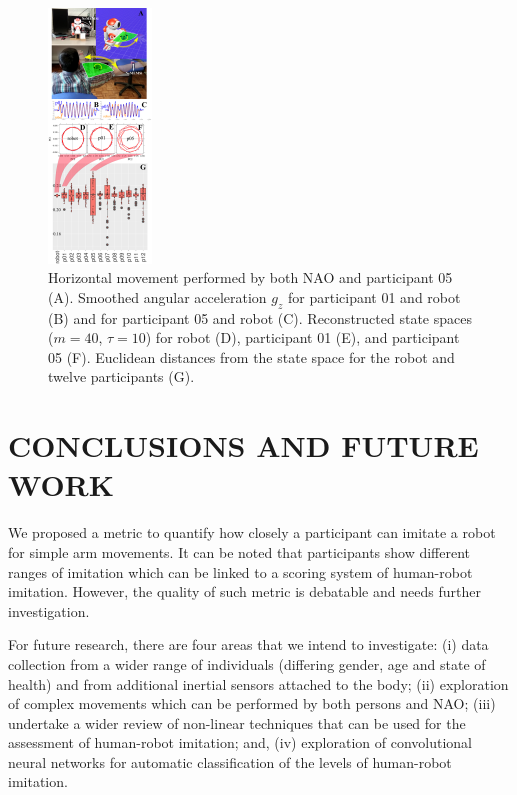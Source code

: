 \documentclass{sig-alternate-05-2015}
\begin{document}
\begin{figure}[ht]
\centering
\includegraphics[width=0.245\textwidth]{fig06}
\caption{
Horizontal movement performed by both NAO and participant 05 (A). 
Smoothed angular acceleration $g_z$ for participant 01  and robot (B)
and for participant 05 and robot (C).
Reconstructed state spaces  ($m=40$, $\tau=10$) for robot (D), participant 01 (E), and participant 05 (F).
Euclidean distances from the state space for the robot and twelve participants (G).
}
\label{fig:main}
\end{figure}



\section{CONCLUSIONS AND FUTURE WORK}
We proposed a metric to quantify how closely a participant can imitate a robot for simple arm
movements.
It can be noted
that participants show different ranges 
of imitation which can be linked to a scoring system of human-robot imitation.
However, the quality of such metric is debatable and needs further investigation.

For future research, there are four areas that we intend to investigate:
(i) data collection from a wider range of individuals (differing gender, age and state of health)
and from additional inertial sensors attached to the body;
(ii) exploration of complex movements which can be performed by both persons and NAO;
(iii) undertake a wider review of non-linear techniques that can be used for 
the assessment of human-robot imitation; and, 
(iv) exploration of convolutional neural networks for automatic 
classification of the levels of human-robot imitation.




 
\end{document}
